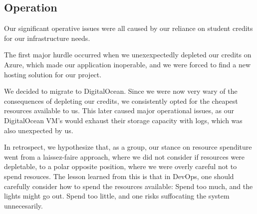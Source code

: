 \subsection{Operation}

Our significant operative issues were all caused by our reliance on student credits for our infrastructure needs.

The first major hurdle occurred when we unexexpectedly depleted our credits on Azure,
which made our
application
inoperable, and we were forced to find a new hosting solution for our project.

We decided to migrate to DigitalOcean.
Since we were now very wary of the consequences of depleting our credits, we consistently opted for the cheapest resources available to us.
This later caused major operational issues, as our DigitalOcean VM's would exhaust their storage capacity with logs, which was also unexpected by us.

In retrospect, we hypothesize that, as a group, our stance on resource spenditure went from a laissez-faire approach, where we did not consider if resources were depletable, to a polar opposite position, where we were overly careful not to spend resouces.
The lesson learned from this is that in DevOps, one should carefully consider how to spend the resources available: Spend too much, and the lights might go out. Spend too little, and one risks suffocating the system unnecesarily.



